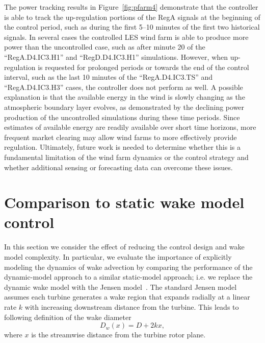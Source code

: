 The power tracking results in Figure~\ref{fig:pfarm4} demonstrate that the controller is able to track the up-regulation portions of the RegA signals at the beginning of the control period, such as during the first 5--10 minutes of the first two historical signals. In several cases the controlled LES wind farm is able to produce more power than the uncontrolled case, such as after minute 20 of the ``RegA.D4.IC3.H1'' and ``RegD.D4.IC3.H1'' simulations. However, when up-regulation is requested for prolonged periods or towards the end of the control interval, such as the last 10 minutes of the ``RegA.D4.IC3.TS'' and ``RegA.D4.IC3.H3'' cases, the controller does not perform as well. A possible explanation is that the available energy in the wind is slowly changing as the atmospheric boundary layer evolves, as demonstrated by the declining power production of the uncontrolled simulations during these time periods. Since estimates of available energy are readily available over short time horizons, more frequent market clearing may allow wind farms to more effectively provide regulation. Ultimately, future work is needed to determine whether this is a fundamental limitation of the wind farm dynamics or the control strategy and whether additional sensing or forecasting data can overcome these issues.

\section{Comparison to static wake model control}
\label{sec:rhc-static}
In this section we consider the effect of reducing the control design and wake model complexity. In particular, we evaluate the importance of explicitly modeling the dynamics of wake advection by comparing the performance of the dynamic-model approach to a similar static-model approach; i.e. we replace the dynamic wake model with the Jensen model~\cite{Katic1986a}. The standard Jensen model assumes each turbine generates a wake region that expands radially at a linear rate $k$ with increasing downstream distance from the turbine. This leads to following definition of the wake diameter 
\begin{equation}
\label{eq:dw}
D_w(x) = D + 2kx,
\end{equation} 
where $x$ is the streamwise distance from the turbine rotor plane. 

